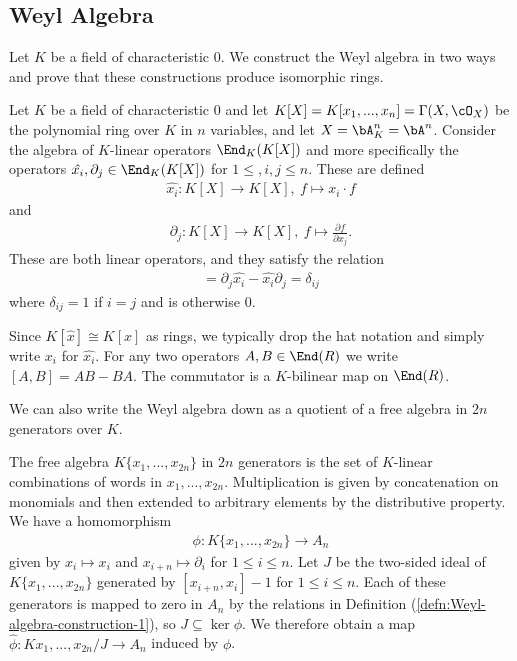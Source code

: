 \subsection{Weyl Algebra}\label{subsec:Weyl-algebra}
Let $K$ be a field of characteristic $0$. We construct the Weyl algebra in two ways and prove that these constructions produce isomorphic rings.

\begin{defn}\label{defn:Weyl-algebra-construction-1}
	Let $K$ be a field of characteristic $0$ and let $K[X] = K[x_1,...,x_n] = \Gamma(X,\cO_X)$ be the polynomial ring over $K$ in $n$ variables, and let $X = \bA^n_K = \bA^n$. Consider the algebra of $K$-linear operators $\End_K(K[X])$ and more specifically the operators $\hat{x_i}, \partial_j \in \End_K(K[X])$ for $1\leq, i,j \leq n$. These are defined
	\begin{align*}
		\hat{x_i}: K[X]\to K[X], ~ f \mapsto x_i \cdot f
	\end{align*}
	and 
	\begin{align*}
		\partial_j:K[X]\to K[X], ~ f\mapsto \frac{\partial f}{\partial x_j}.
	\end{align*}
	These are both linear operators, and they satisfy the relation
	\begin{align*}
		[\partial_j, \hat{x_i}] = \partial_j \hat{x_i} - \hat{x_i}\partial_j = \delta_{ij}
	\end{align*}
	where $\delta_{ij} = 1$ if $i = j$ and is otherwise 0. 
\end{defn}
Since $K[\hat{x}] \cong K[x]$ as rings, we typically drop the hat notation and simply write $x_i$ for $\hat{x_i}$. For any two operators $A,B \in \End(R)$ we write  $[A,B] = AB - BA$. The commutator is a $K$-bilinear map on $\End(R)$.

We can also write the Weyl algebra down as a quotient of a free algebra in $2n$ generators over $K$.

\begin{defn}\label{defn:Weyl-algebra-construction-2}
	The free algebra $K\{x_1,...,x_{2n}\}$ in $2n$ generators is the set of $K$-linear combinations of words in $x_1,...,x_{2n}$. Multiplication is given by concatenation on monomials and then extended to arbitrary elements by the distributive property. We have a homomorphism
	\begin{align*}
		\phi:K\{x_1,...,x_{2n}\} \to A_n
	\end{align*}
	given by $x_i \mapsto x_i$ and $x_{i+n} \mapsto \partial_i$ for $1\leq i\leq n$. Let $J$ be the two-sided ideal of  $K\{x_1,...,x_{2n}\}$ generated by $[x_{i+n},x_i] - 1$ for $1\leq i\leq n$. Each of these generators is mapped to zero in $A_n$ by the relations in Definition (\ref{defn:Weyl-algebra-construction-1}), so $J \subseteq \ker \phi$. We therefore obtain a map $\hat{\phi}:K{x_1,...,x_{2n}}/J\to A_n$ induced by $\phi$.
\end{defn}

